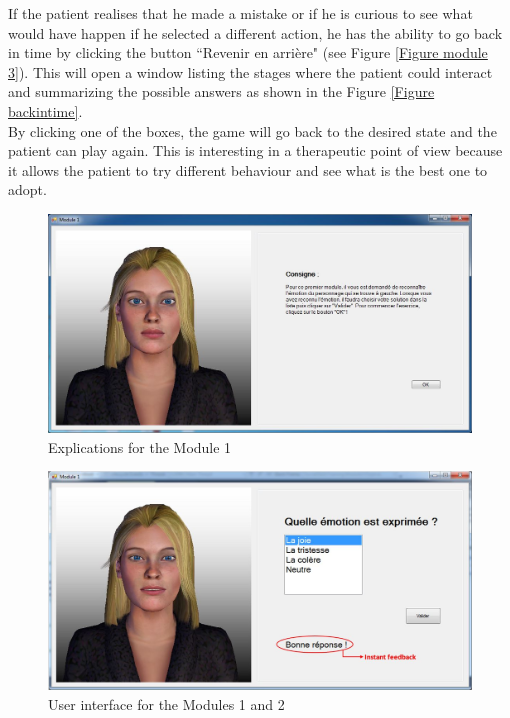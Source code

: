 \documentclass[11pt]{article}
\begin{document}
If the patient realises that he made a mistake or if he is curious to see what would have happen if he selected a different action, he has the ability to go back in time by clicking the button ``Revenir en arri\`{e}re" (see Figure \ref{Figure module 3}). This will open a window listing the stages where the patient could interact and summarizing the possible answers as shown in the Figure \ref{Figure backintime}. \\

By clicking one of the boxes, the game will go back to the desired state and the patient can play again. This is interesting in a therapeutic point of view because it allows the patient to try different behaviour and see what is the best one to adopt.
\clearpage
\begin{figure}
   	\centerline{\includegraphics[scale=0.61]{./images/consignes}}
   	\caption{\label{Figure consignes} Explications for the Module 1}
\end{figure}
\begin{figure}
   	\centerline{\includegraphics[scale=0.55]{./images/module1&2}}
   	\caption{\label{Figure module 1 and 2} User interface for the Modules 1 and 2}
\end{figure}
\end{document}
